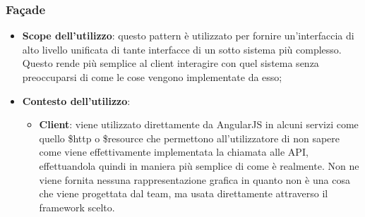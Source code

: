 	\subsubsection{Fa\c{c}ade} %
	\label{ssub:facade}
		\begin{itemize}
			\item \textbf{Scope dell'utilizzo}: questo pattern è utilizzato per fornire un'interfaccia di alto livello unificata di tante interfacce di un sotto sistema più complesso. Questo rende più semplice al client interagire con quel sistema senza preoccuparsi di come le cose vengono implementate da esso;
			\item \textbf{Contesto dell'utilizzo}:
				\begin{itemize}
					\item \textbf{Client}: viene utilizzato direttamente da AngularJS in alcuni servizi come quello \$http o \$resource che permettono all'utilizzatore di non sapere come viene effettivamente implementata la chiamata alle API, effettuandola quindi in maniera più semplice di come è realmente. \newline
					Non ne viene fornita nessuna rappresentazione grafica in quanto non è una cosa che viene progettata dal team, ma usata direttamente attraverso il framework scelto.
				\end{itemize}
		\end{itemize}


